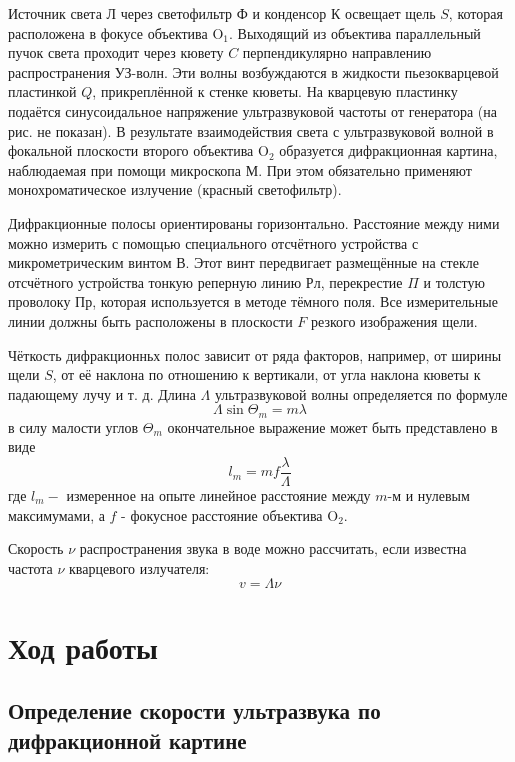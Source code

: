 \documentclass[a4paper, 12pt]{article}
\begin{document}
Источник света Л через светофильтр Ф и конденсор К освещает щель $S$, которая расположена в фокусе объектива $\mathrm{O}_1$. Выходящий из объектива параллельный пучок света проходит через кювету $C$ перпендикулярно направлению распространения УЗ-волн. Эти волны возбуждаются в жидкости пьезокварцевой пластинкой $Q$, прикреплённой к стенке кюветы. На кварцевую пластинку подаётся синусоидальное напряжение ультразвуковой частоты от генератора (на рис. не показан). В результате взаимодействия света с ультразвуковой волной в фокальной плоскости второго объектива $\mathrm{O}_2$ образуется дифракционная картина, наблюдаемая при помощи микроскопа М. При этом обязательно применяют монохроматическое излучение (красный светофильтр).

Дифракционные полосы ориентированы горизонтально. Расстояние между ними можно измерить с помощью специального отсчётного устройства с микрометрическим винтом В. Этот винт передвигает размещённые на стекле отсчётного устройства тонкую реперную линию Рл, перекрестие $\Pi$ и толстую проволоку Пр, которая используется в методе тёмного поля. Все измерительные линии должны быть расположены в плоскости $F$ резкого изображения щели.

Чёткость дифракционньх полос зависит от ряда факторов, например, от ширины щели $S$, от её наклона по отношению к вертикали, от угла наклона кюветы к падающему лучу и т. д.
Длина $\Lambda$ ультразвуковой волны определяется по формуле
\begin{equation}
\Lambda \sin \Theta_m=m \lambda
\end{equation}
в силу малости углов $\Theta_m$ окончательное выражение может быть представлено в виде
\begin{equation}
l_m=m f \frac{\lambda}{\Lambda}
\end{equation}
где $l_m-$ измеренное на опыте линейное расстояние между $m$-м и нулевым максимумами, а $f$ - фокусное расстояние объектива $\mathrm{O}_2$.

Скорость $\nu$ распространения звука в воде можно рассчитать, если известна частота $\nu$ кварцевого излучателя:
\begin{equation}
v=\Lambda \nu
\end{equation}

\section{Ход работы}
\subsection*{Определение скорости ультразвука по дифракционной картине}
\end{document}
